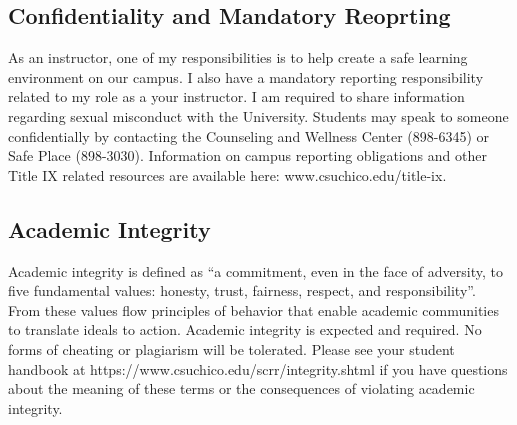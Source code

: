 \documentclass[
  letterpaper,
  DIV=11,
  numbers=noendperiod]{scrartcl}
\begin{document}
\hypertarget{confidentiality-and-mandatory-reoprting}{%
\subsection{Confidentiality and Mandatory
Reoprting}\label{confidentiality-and-mandatory-reoprting}}

As an instructor, one of my responsibilities is to help create a safe
learning environment on our campus. I also have a mandatory reporting
responsibility related to my role as a your instructor. I am required to
share information regarding sexual misconduct with the University.
Students may speak to someone confidentially by contacting the
Counseling and Wellness Center (898-6345) or Safe Place (898-3030).
Information on campus reporting obligations and other Title IX related
resources are available here: www.csuchico.edu/title-ix.

\hypertarget{academic-integrity}{%
\subsection{Academic Integrity}\label{academic-integrity}}

Academic integrity is defined as ``a commitment, even in the face of
adversity, to five fundamental values: honesty, trust, fairness,
respect, and responsibility''. From these values flow principles of
behavior that enable academic communities to translate ideals to action.
Academic integrity is expected and required. No forms of cheating or
plagiarism will be tolerated. Please see your student handbook at
https://www.csuchico.edu/scrr/integrity.shtml if you have questions
about the meaning of these terms or the consequences of violating
academic integrity.
\end{document}
